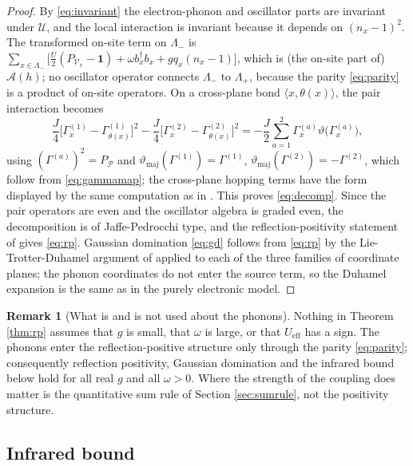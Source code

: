 \documentclass[11pt]{article}
\numberwithin{equation}{section}
\newcommand{\id}{\mathbf{1}}
\newcommand{\Lamb}{\Lambda}
\newcommand{\eff}{\mathrm{eff}}
\newcommand{\maj}{\mathrm{maj}}
\newcommand{\Gam}{\Gamma}
\theoremstyle{definition}
\newtheorem{remark}[theorem]{Remark}
\begin{document}
\begin{proof}
By \eqref{eq:invariant} the electron-phonon and oscillator parts are invariant under $\mathcal{U}$, and
the local interaction is invariant because it depends on $(n_{x}-1)^{2}$. The
transformed on-site term on $\Lamb_{-}$ is
$\sum_{x\in\Lamb_{-}}\big[\frac{U}{2}(P_{\mathcal{V}_{x}}-\id)+\omega b_{x}^{\dagger}b_{x}+g q_{x}(n_{x}-1)\big]$,
which is (the on-site part of) $\mathcal{A}(h)$; no oscillator operator connects
$\Lamb_{-}$ to $\Lamb_{+}$, because the parity \eqref{eq:parity} is a product of on-site operators.
On a cross-plane bond $\langle x,\theta(x)\rangle$, the pair interaction becomes
\begin{equation}
\frac{J}{4}\Big[\Gam^{(1)}_{x}-\Gam^{(1)}_{\theta(x)}\Big]^{2}-\frac{J}{4}\Big[\Gam^{(2)}_{x}-\Gam^{(2)}_{\theta(x)}\Big]^{2}
=-\frac{J}{2}\sum_{a=1}^{2}\Gam^{(a)}_{x}\vartheta\big(\Gam^{(a)}_{x}\big),
\end{equation}
using $(\Gam^{(a)})^{2}=P_{\mathcal{P}}$ and $\vartheta_{\maj}(\Gam^{(1)})=\Gam^{(1)}$,
$\vartheta_{\maj}(\Gam^{(2)})=-\Gam^{(2)}$, which follow from \eqref{eq:gammamap}; the cross-plane
hopping terms have the form displayed by the same computation as in
\cite{koma2022}. This proves \eqref{eq:decomp}. Since the pair
operators are even and the oscillator algebra is graded even, the decomposition is of
Jaffe-Pedrocchi type, and the reflection-positivity statement of \cite{jaffe2015b} gives
\eqref{eq:rp}. Gaussian domination \eqref{eq:gd} follows from \eqref{eq:rp} by the
Lie-Trotter-Duhamel argument of \cite{dyson1978} applied to each of the three families of coordinate
planes; the phonon coordinates do not enter the source term, so the Duhamel expansion is
the same as in the purely electronic model.
\end{proof}

\begin{remark}[What is and is not used about the phonons]\label{rem:rpreally}
Nothing in Theorem \ref{thm:rp} assumes that $g$ is small, that $\omega$ is large, or
that $U_{\eff}$ has a sign. The phonons enter the reflection-positive structure only
through the parity \eqref{eq:parity}; consequently reflection positivity, Gaussian domination and
the infrared bound below hold for all real $g$ and all $\omega>0$. Where the strength of
the coupling does matter is the quantitative sum rule of Section \ref{sec:sumrule}, not
the positivity structure.
\end{remark}

\subsection{Infrared bound}
\end{document}
